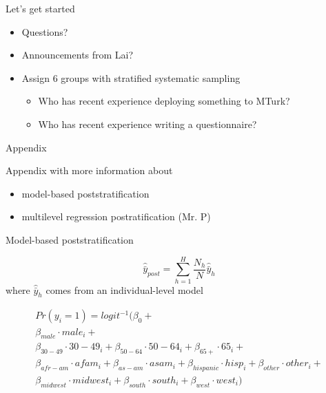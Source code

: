 \documentclass[aspectratio=169]{beamer}
\begin{document}
\begin{frame}

Let's get started 
\begin{itemize}
\item Questions?
\pause
\item Announcements from Lai?
\pause
\item Assign 6 groups with stratified systematic sampling
\begin{itemize}
\item Who has recent experience deploying something to MTurk? \pause
\item Who has recent experience writing a questionnaire? 
\end{itemize}
\end{itemize}

\end{frame}
\begin{frame}{Appendix}

Appendix with more information about 
\begin{itemize}
\item model-based poststratification
\item multilevel regression postratification (Mr. P)
\end{itemize}

\end{frame}
\begin{frame}{Model-based poststratification}

\begin{equation*}
\hat{\bar{y}}_{post} = \sum_{h=1}^H \frac{N_h}{N} \hat{\bar{y}}_h
\end{equation*}
where
$\hat{\bar{y}}_h$ comes from an individual-level model

\begin{align*}
Pr(y_i = 1) = logit^{-1} (\beta_0 + \\
 \beta_{male} \cdot male_i+ \\
 \beta_{30-49} \cdot 30-49_i + \beta_{50 - 64} \cdot 50-64_i+ \beta_{65+} \cdot 65_i +\\
 \beta_{afr-am} \cdot afam_i + \beta_{as-am} \cdot asam_i+ \beta_{hispanic} \cdot hisp_i + \beta_{other} \cdot other_i + \\
 \beta_{midwest} \cdot midwest_i + \beta_{south} \cdot south_i + \beta_{west} \cdot west_i)
\end{align*}

\end{frame}
\end{document}
